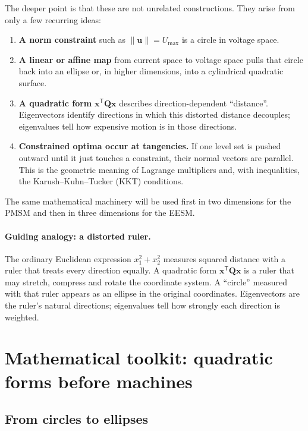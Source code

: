\documentclass[11pt,a4paper]{article}
\newcommand{\Umax}{U_{\max}}
\newcommand{\T}{\mathsf{T}}
\newcommand{\vct}[1]{\bm{#1}}
\newcommand{\mat}[1]{\bm{#1}}
\begin{document}
The deeper point is that these are not unrelated constructions. They arise from only a few recurring ideas:

\begin{enumerate}
  \item \textbf{A norm constraint} such as $\|\vct u\|=\Umax$ is a circle in voltage space.
  \item \textbf{A linear or affine map} from current space to voltage space pulls that circle back into an ellipse or, in higher dimensions, into a cylindrical quadratic surface.
  \item \textbf{A quadratic form} $\vct x^\T \mat Q\vct x$ describes direction-dependent ``distance''. Eigenvectors identify directions in which this distorted distance decouples; eigenvalues tell how expensive motion is in those directions.
  \item \textbf{Constrained optima occur at tangencies.} If one level set is pushed outward until it just touches a constraint, their normal vectors are parallel. This is the geometric meaning of Lagrange multipliers and, with inequalities, the Karush--Kuhn--Tucker (KKT) conditions.
\end{enumerate}

The same mathematical machinery will be used first in two dimensions for the PMSM and then in three dimensions for the EESM.

\paragraph{Guiding analogy: a distorted ruler.}
The ordinary Euclidean expression $x_1^2+x_2^2$ measures squared distance with a ruler that treats every direction equally. A quadratic form $\vct x^\T\mat Q\vct x$ is a ruler that may stretch, compress and rotate the coordinate system. A ``circle'' measured with that ruler appears as an ellipse in the original coordinates. Eigenvectors are the ruler's natural directions; eigenvalues tell how strongly each direction is weighted.

\section{Mathematical toolkit: quadratic forms before machines}

\subsection{From circles to ellipses}
\end{document}
